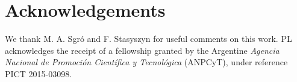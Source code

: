 \documentclass[fleqn,usenatbib]{mnras}
\begin{document}
\section*{Acknowledgements}
We thank M. A. Sgr\'o and F. Stasyszyn for useful comments on this work. PL acknowledges the receipt of a fellowship granted by the Argentine \emph{Agencia Nacional de Promoci\'on Cient\'ifica y Tecnol\'ogica} (ANPCyT), under reference PICT 2015-03098. 
















\bsp	%
\label{lastpage}
\end{document}
